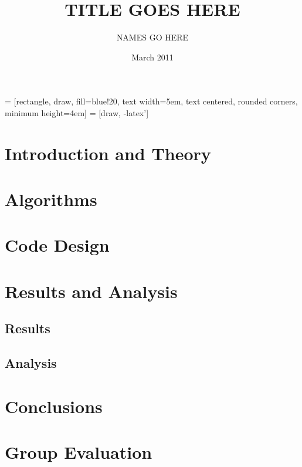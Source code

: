 \documentclass[12pt]{report}
\title{TITLE GOES HERE}
\author{NAMES GO HERE}
\date{March 2011}
\begin{document}
\usetikzlibrary{shapes,arrows}


 = [rectangle, draw, fill=blue!20, 
    text width=5em, text centered, rounded corners, minimum height=4em]
 = [draw, -latex']

\maketitle

\begin{abstract}
\end{abstract}

\tableofcontents

\chapter{Introduction and Theory}

\chapter{Algorithms}

\chapter{Code Design}

\chapter{Results and Analysis}
\section{Results}
\section{Analysis}

\chapter{Conclusions}

\chapter{Group Evaluation}
\end{document}
